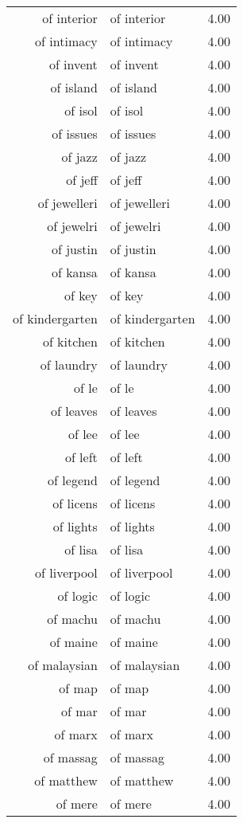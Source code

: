 \begin{table}[ht]
\begin{tabular}{rlr}
  of interior & of interior & 4.00 \\ 
  of intimacy & of intimacy & 4.00 \\ 
  of invent & of invent & 4.00 \\ 
  of island & of island & 4.00 \\ 
  of isol & of isol & 4.00 \\ 
  of issues & of issues & 4.00 \\ 
  of jazz & of jazz & 4.00 \\ 
  of jeff & of jeff & 4.00 \\ 
  of jewelleri & of jewelleri & 4.00 \\ 
  of jewelri & of jewelri & 4.00 \\ 
  of justin & of justin & 4.00 \\ 
  of kansa & of kansa & 4.00 \\ 
  of key & of key & 4.00 \\ 
  of kindergarten & of kindergarten & 4.00 \\ 
  of kitchen & of kitchen & 4.00 \\ 
  of laundry & of laundry & 4.00 \\ 
  of le & of le & 4.00 \\ 
  of leaves & of leaves & 4.00 \\ 
  of lee & of lee & 4.00 \\ 
  of left & of left & 4.00 \\ 
  of legend & of legend & 4.00 \\ 
  of licens & of licens & 4.00 \\ 
  of lights & of lights & 4.00 \\ 
  of lisa & of lisa & 4.00 \\ 
  of liverpool & of liverpool & 4.00 \\ 
  of logic & of logic & 4.00 \\ 
  of machu & of machu & 4.00 \\ 
  of maine & of maine & 4.00 \\ 
  of malaysian & of malaysian & 4.00 \\ 
  of map & of map & 4.00 \\ 
  of mar & of mar & 4.00 \\ 
  of marx & of marx & 4.00 \\ 
  of massag & of massag & 4.00 \\ 
  of matthew & of matthew & 4.00 \\ 
  of mere & of mere & 4.00 \\ 

\end{tabular}
\end{table}

